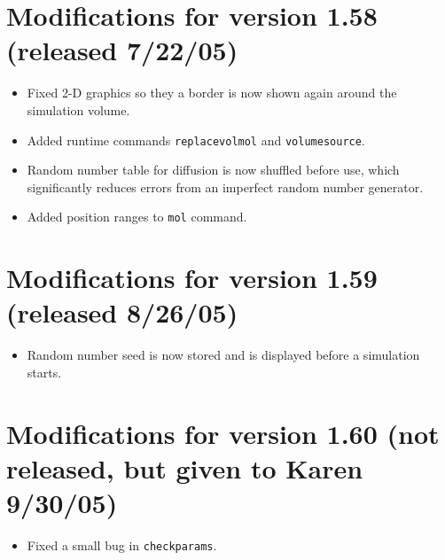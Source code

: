 \documentclass {scrbook}
\newcommand {\ttt} {\texttt}
\begin{document}
\section{Modifications for version 1.58 (released 7/22/05)}
\begin{itemize}
\item Fixed 2-D graphics so they a border is now shown again around the simulation volume.
\item Added runtime commands \ttt{replacevolmol} and \ttt{volumesource}.
\item Random number table for diffusion is now shuffled before use, which significantly reduces errors from an imperfect random number generator.
\item Added position ranges to \ttt{mol} command.
\end{itemize}

\section{Modifications for version 1.59 (released 8/26/05)}
\begin{itemize}
\item Random number seed is now stored and is displayed before a simulation starts.
\end{itemize}

\section{Modifications for version 1.60 (not released, but given to Karen 9/30/05)}
\begin{itemize}
\item Fixed a small bug in \ttt{checkparams}.
\end{itemize}
\end{document}
